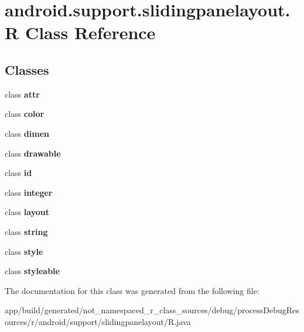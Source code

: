 \hypertarget{classandroid_1_1support_1_1slidingpanelayout_1_1_r}{}\section{android.\+support.\+slidingpanelayout.\+R Class Reference}
\label{classandroid_1_1support_1_1slidingpanelayout_1_1_r}
\subsection*{Classes}
\begin{DoxyCompactItemize}
\item 
class {\bfseries attr}
\item 
class {\bfseries color}
\item 
class {\bfseries dimen}
\item 
class {\bfseries drawable}
\item 
class {\bfseries id}
\item 
class {\bfseries integer}
\item 
class {\bfseries layout}
\item 
class {\bfseries string}
\item 
class {\bfseries style}
\item 
class {\bfseries styleable}
\end{DoxyCompactItemize}


The documentation for this class was generated from the following file\+:\begin{DoxyCompactItemize}
\item 
app/build/generated/not\+\_\+namespaced\+\_\+r\+\_\+class\+\_\+sources/debug/process\+Debug\+Resources/r/android/support/slidingpanelayout/R.\+java\end{DoxyCompactItemize}
